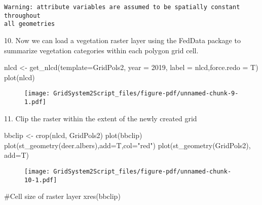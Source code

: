 \documentclass[
  letterpaper,
]{book}
\newenvironment{Shaded}{\begin{snugshade}}{\end{snugshade}}
\newcommand{\AttributeTok}[1]{\textcolor[rgb]{0.40,0.45,0.13}{#1}}
\newcommand{\CommentTok}[1]{\textcolor[rgb]{0.37,0.37,0.37}{#1}}
\newcommand{\DecValTok}[1]{\textcolor[rgb]{0.68,0.00,0.00}{#1}}
\newcommand{\FunctionTok}[1]{\textcolor[rgb]{0.28,0.35,0.67}{#1}}
\newcommand{\NormalTok}[1]{\textcolor[rgb]{0.00,0.23,0.31}{#1}}
\newcommand{\OtherTok}[1]{\textcolor[rgb]{0.00,0.23,0.31}{#1}}
\newcommand{\StringTok}[1]{\textcolor[rgb]{0.13,0.47,0.30}{#1}}
\begin{document}
\begin{verbatim}
Warning: attribute variables are assumed to be spatially constant throughout
all geometries
\end{verbatim}

10. Now we can load a vegetation raster layer using the FedData package
to summarize vegetation categories within each polygon grid cell.

\begin{Shaded}
\begin{Highlighting}[]
\NormalTok{nlcd }\OtherTok{\textless{}{-}} \FunctionTok{get\_nlcd}\NormalTok{(}\AttributeTok{template=}\NormalTok{GridPols2, }\AttributeTok{year =} \DecValTok{2019}\NormalTok{, }\AttributeTok{label =} \StringTok{\textquotesingle{}nlcd\textquotesingle{}}\NormalTok{,}\AttributeTok{force.redo =}\NormalTok{ T)}
\FunctionTok{plot}\NormalTok{(nlcd)}
\end{Highlighting}
\end{Shaded}

\begin{figure}[H]

{\centering \texttt{[image: GridSystem2Script\_files/figure-pdf/unnamed-chunk-9-1.pdf]}

}

\end{figure}

11. Clip the raster within the extent of the newly created grid

\begin{Shaded}
\begin{Highlighting}[]
\NormalTok{bbclip }\OtherTok{\textless{}{-}} \FunctionTok{crop}\NormalTok{(nlcd, GridPols2)}
\FunctionTok{plot}\NormalTok{(bbclip)}
\FunctionTok{plot}\NormalTok{(}\FunctionTok{st\_geometry}\NormalTok{(deer.albers),}\AttributeTok{add=}\NormalTok{T,}\AttributeTok{col=}\StringTok{"red"}\NormalTok{)}
\FunctionTok{plot}\NormalTok{(}\FunctionTok{st\_geometry}\NormalTok{(GridPols2), }\AttributeTok{add=}\NormalTok{T)}
\end{Highlighting}
\end{Shaded}

\begin{figure}[H]

{\centering \texttt{[image: GridSystem2Script\_files/figure-pdf/unnamed-chunk-10-1.pdf]}

}

\end{figure}

\begin{Shaded}
\begin{Highlighting}[]
\CommentTok{\#Cell size of raster layer}
\FunctionTok{xres}\NormalTok{(bbclip)}
\end{Highlighting}
\end{Shaded}
\end{document}
